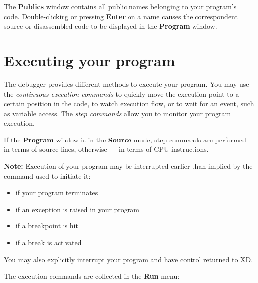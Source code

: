 The {\bf Publics} window contains all public names belonging to your
program's code. Double-clicking or pressing {\bf Enter} on a name
causes the correspondent source or disassembled code to be
displayed in the {\bf Program} window.


\section{Executing your program}
\label{dialog:executing}

The debugger provides different methods to execute your program. You
may use the {\it continuous execution commands} to quickly move the execution
point to a certain position in the code, to watch execution flow,
or to wait for an event, such as variable access. The {\it step commands}
allow you to monitor your program execution.

If the {\bf Program} window is in the {\bf Source} mode, step commands
are performed in terms of source lines, otherwise --- in terms of CPU
instructions.

{\bf Note:} Execution of your program may be interrupted earlier than
implied by the command used to initiate it:
\begin{itemize}
\item if your program terminates
\item if an exception is raised in your program
\item if a breakpoint is hit
\item if a break is activated
\end{itemize}
You may also explicitly interrupt your program and have control
returned to XD.

The execution commands are collected in the {\bf Run} menu:

